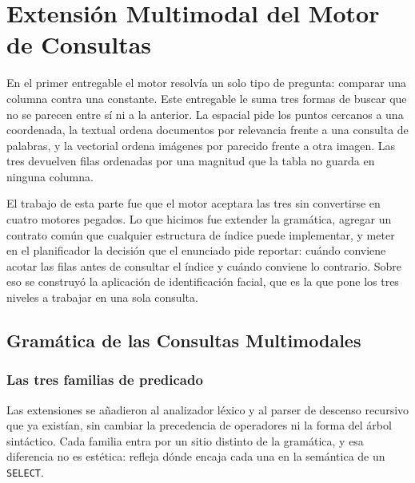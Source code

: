 \documentclass[a4paper,12pt]{article}
\begin{document}

\section{Extensión Multimodal del Motor de Consultas}

En el primer entregable el motor resolvía un solo tipo de pregunta: comparar una
columna contra una constante. Este entregable le suma tres formas de buscar que
no se parecen entre sí ni a la anterior. La espacial pide los puntos cercanos a
una coordenada, la textual ordena documentos por relevancia frente a una
consulta de palabras, y la vectorial ordena imágenes por parecido frente a otra
imagen. Las tres devuelven filas ordenadas por una magnitud que la tabla no
guarda en ninguna columna.

El trabajo de esta parte fue que el motor aceptara las tres sin convertirse en
cuatro motores pegados. Lo que hicimos fue extender la gramática, agregar un
contrato común que cualquier estructura de índice puede implementar, y meter en
el planificador la decisión que el enunciado pide reportar: cuándo conviene
acotar las filas antes de consultar el índice y cuándo conviene lo contrario.
Sobre eso se construyó la aplicación de identificación facial, que es la que
pone los tres niveles a trabajar en una sola consulta.

\subsection{Gramática de las Consultas Multimodales}

\subsubsection{Las tres familias de predicado}

Las extensiones se añadieron al analizador léxico y al parser de descenso
recursivo que ya existían, sin cambiar la precedencia de operadores ni la forma
del árbol sintáctico. Cada familia entra por un sitio distinto de la gramática,
y esa diferencia no es estética: refleja dónde encaja cada una en la semántica
de un \texttt{SELECT}.
\end{document}
